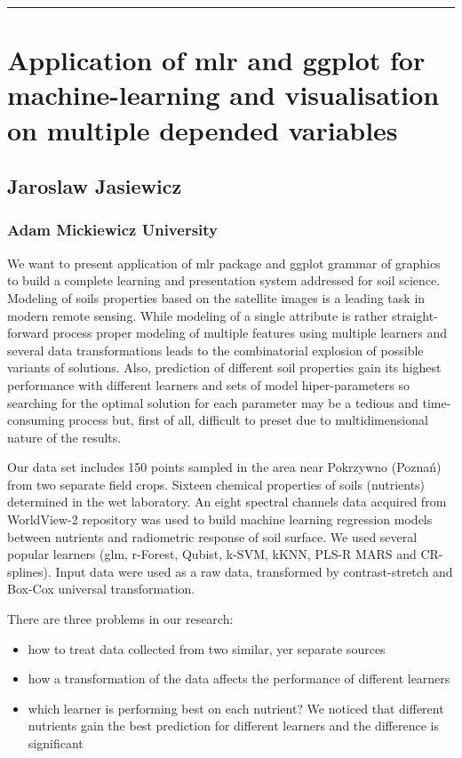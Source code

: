 \documentclass [12pt]{article}
\begin{document}
\noindent\rule{\textwidth}{1pt}
\section{Application of mlr and ggplot for machine-learning and visualisation on multiple depended variables}
\subsection*{Jaroslaw	Jasiewicz}
\subsubsection*{Adam Mickiewicz University}

We want to present application of mlr package and ggplot grammar of graphics to build a complete learning and presentation system addressed for soil science. Modeling of soils properties based on the satellite images is a leading task in modern remote sensing. While modeling of a single attribute is rather straight-forward process proper modeling of multiple features using multiple learners and several data transformations leads to the combinatorial explosion of possible variants of solutions. Also, prediction of different soil properties gain its highest performance with different learners and sets of model hiper-parameters so searching for the optimal solution for each parameter may be a tedious and time-consuming process but, first of all, difficult to preset due to multidimensional nature of the results.

Our data set includes 150 points sampled in the area near Pokrzywno (Poznań) from two separate field crops. Sixteen chemical properties of soils (nutrients) determined in the wet laboratory. An eight spectral channels data acquired from WorldView-2 repository was used to build machine learning regression models between nutrients and radiometric response of soil surface. We used several popular learners (glm, r-Forest, Qubist, k-SVM, kKNN, PLS-R MARS and CR-splines). Input data were used as a raw data, transformed by contrast-stretch and Box-Cox universal transformation.

There are three problems in our research:
\begin{itemize}
\setlength\itemsep{.15em}
\item how to treat data collected from two similar, yer separate sources
\item how a transformation of the data affects the performance of different learners
\item which learner is performing best on each nutrient? We noticed that different nutrients gain the best prediction for different learners and the difference is significant
\end{itemize}
\end{document}
